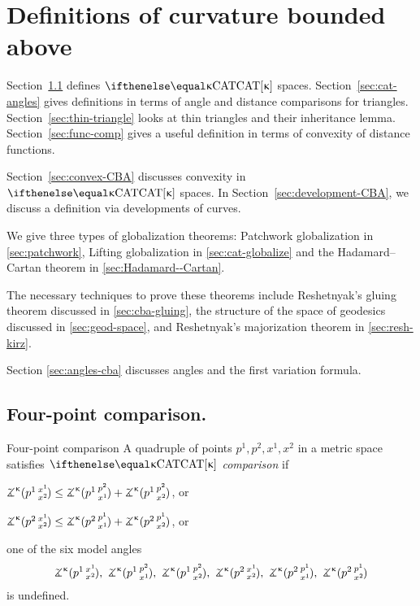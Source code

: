 
\chapter{Definitions of curvature bounded above}
Section~\ref{sec:cba-def} defines $\CAT\kappa$ spaces.  
Section~\ref{sec:cat-angles} gives definitions in terms of angle and distance comparisons for triangles.  
Section~\ref{sec:thin-triangle} looks at thin triangles and their inheritance lemma. 
Section~\ref{sec:func-comp} gives a useful definition in terms of convexity of distance functions.

Section~\ref{sec:convex-CBA} discusses convexity in  $\CAT{\kappa}$ spaces.
In Section~\ref{sec:development-CBA}, we discuss a definition via developments of  curves.

We give three types of globalization theorems:
Patchwork globalization in \ref{sec:patchwork},
Lifting globalization in \ref{sec:cat-globalize}
and the Hadamard--Cartan theorem in \ref{sec:Hadamard--Cartan}.

The necessary techniques to prove these theorems include 
Reshetnyak's gluing theorem discussed in \ref{sec:cba-gluing},
the structure of the space of geodesics discussed in \ref{sec:geod-space}, 
and Reshetnyak's majorization theorem in \ref{sec:resh-kirz}.

Section \ref{sec:angles-cba} discusses angles and the first variation formula.   


\section{Four-point comparison.} \label{sec:cba-def}

      
\begin{thm}{Four-point comparison}\label{def:2+2}
A quadruple of points $p^1,p^2,x^1,x^2$ in a metric space 
satisfies
\emph{$\CAT\kappa$ comparison} 
if
  
\begin{subthm}{}
$\angk{\kappa}{p^1}{x^1}{x^2} 
\le 
\angk{\kappa}{p^1}{p^2}{x^1}+\angk{\kappa}{p^1}{p^2}{x^2}$, or
\end{subthm}

\begin{subthm}{}
$\angk{\kappa} {p^2}{x^1}{x^2}\le \angk{\kappa} {p^2}{p^1}{x^1} + \angk{\kappa} {p^2}{p^1}{x^2}$, or
\end{subthm}

\begin{subthm}{}
one of the six model angles 
\[\angk{\kappa}{p^1}{x^1}{x^2},\ \angk{\kappa}{p^1}{p^2}{x^1},\ \angk{\kappa}{p^1}{p^2}{x^2},\ \angk{\kappa}{p^2}{x^1}{x^2},\ \angk{\kappa}{p^2}{p^1}{x^1},\ \angk{\kappa}{p^2}{p^1}{x^2}\]
is undefined.
\end{subthm}
\end{thm}

